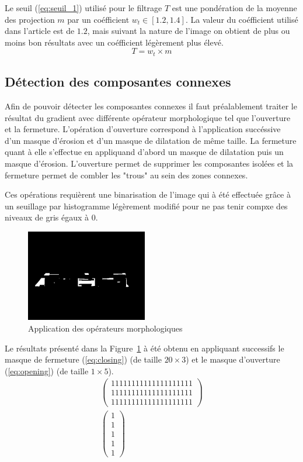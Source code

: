 \documentclass[a4paper,10pt,twocolumn]{article}
\begin{document}
Le seuil (\ref{eq:seuil_1}) utilisé pour le filtrage $T$ est une pondération de la moyenne des projection $m$ par un coéfficient $w_t \in [1.2, 1.4]$. La valeur du coéfficient utilisé dans l'article est de $1.2$, mais suivant la nature de l'image on obtient de plus ou moins bon résultats avec un coéfficient légèrement plus élevé.
\begin{equation} \label{eq:seuil_1} 
  T = w_t \times m
\end{equation}

\subsection{Détection des composantes connexes}
Afin de pouvoir détecter les composantes connexes il faut préalablement traiter le résultat du gradient avec différente opérateur morphologique tel que l'ouverture et la fermeture. L'opération d'ouverture correspond à l'application succéssive d'un masque d'érosion et d'un masque de dilatation de même taille. La fermeture quant à elle s'effectue en appliquand d'abord un masque de dilatation puis un masque d'érosion. L'ouverture permet de supprimer les composantes isolées et la fermeture permet de combler les "trous" au sein des zones connexes.

Ces opérations requièrent une binarisation de l'image qui à été effectuée grâce à un seuillage par histogramme légèrement modifié pour ne pas tenir compxe des niveaux de gris égaux à 0.
\begin{figure}[H]
	\centering 
	  \includegraphics[width=200px]{img/991213-006_morpho.png}
	\caption{Application des opérateurs morphologiques\label{morpho}}
\end{figure}
Le résultats présenté dans la Figure~\ref{morpho} à été obtenu en appliquant successifs le masque de fermeture (\ref{eq:closing}) (de taille $20 \times 3$) et le masque d'ouverture (\ref{eq:opening}) (de taille $1 \times 5$).
\begin{gather}
  \label{eq:closing}
  \left( \begin{array}{c} 
    1 1 1 1 1 1 1 1 1 1 1 1 1 1 1 1 1 1 1 1\\
    1 1 1 1 1 1 1 1 1 1 1 1 1 1 1 1 1 1 1 1\\
    1 1 1 1 1 1 1 1 1 1 1 1 1 1 1 1 1 1 1 1    
  \end{array} \right)\\
  \label{eq:opening}
  \left( \begin{array}{c} 
    1\\
    1\\
    1\\
    1\\
    1   
  \end{array} \right)
\end{gather}
\end{document}
